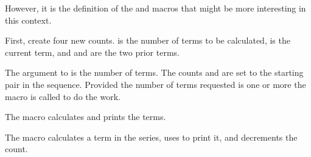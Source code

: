 However, it is the definition of the \cmd{\fibseries} and \cmd{\gfibseries}
macros that might be more interesting in this context. 

    First, create four new counts.  is the number of terms to be
calculated,  is the current term, and  and 
are the two prior terms.
\begin{lcode}
\newcount\fib
\newcount\fibprev
\newcount\fibprevprev
\newcount\fibtogo
\end{lcode}
The argument to \cmd{\fibseries} is the number of terms. The counts
 and  are set to the starting pair in the sequence.
Provided the number of terms requested is one or more the macro 
\cmd{\@fibseries} is called to do the work.
\begin{lcode}
\newcommand*{\fibseries}[1]{%
  \fibprevprev=1\relax
  \fibprev=1\relax
  \ifnum #1>0\relax
    \@fibseries{#1}%
  \fi}
\end{lcode}

The macro \cmd{\@fibseries} calculates and prints the terms. 
\begin{lcode}
\newcommand*{\@fibseries}[1]{%
  \fibtogo=#1\relax
\end{lcode}
It's simple if no more than two terms have been asked for --- just print
them out.
\begin{lcode}
  \ifnum \fibtogo=\@ne
    \the\fibprevprev
  \else
    \ifnum \fibtogo=\tw@
      \the\fibprevprev{} and \the\fibprev
    \else
\end{lcode}
Three or more terms have to be calculated. We reduce the number to be 
calculated by 2, and print the first two terms.
\begin{lcode}
      \advance\fibtogo by -\tw@
      \the\fibprevprev, \the\fibprev
\end{lcode}
We now have to calculate the rest of the terms, where each term is the sum of
the two previous terms. 
The macro \cmd{\@fibnext} calculates the next term, prints it out and reduces
the number of terms left to be calculated (\cmd{\fibtogo}) by one. 
If there are terms left to be done then the process is repeated until 
they have all been printed.
\begin{lcode}
      \loop
        \@fibnext
      \ifnum \fibtogo>\z@
      \repeat
    \fi
  \fi}
\end{lcode}

The \cmd{\@fibnext} macro calculates a term in the series, uses 
\cmd{\printfibterm} to print it, and decrements the \cmd{\fibtogo} count.
\begin{lcode}
\newcommand*{\@fibnext}{%
  \fib=\fibprev
  \advance\fib by \fibprevprev
  \fibprevprev=\fibprev
  \fibprev=\fib
  \printfibterm
  \advance\fibtogo \m@ne}
\end{lcode}

